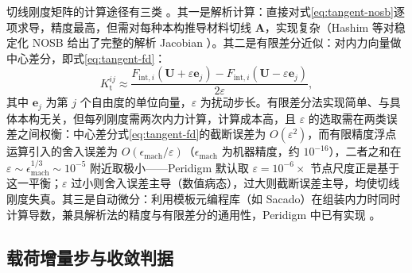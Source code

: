 切线刚度矩阵的计算途径有三类 \cite{Littlewood2015}。其一是解析计算：直接对式\eqref{eq:tangent-nosb}逐项求导，精度最高，但需对每种本构推导材料切线 $\mathbf{A}$，实现复杂（Hashim 等对稳定化 NOSB 给出了完整的解析 Jacobian \cite{Hashim2020}）。其二是有限差分近似：对内力向量做中心差分，即式\eqref{eq:tangent-fd}：
\begin{equation}
  K_{\mathrm{t}}^{ij}\approx\frac{F_{\mathrm{int},i}(\mathbf{U}+\varepsilon\mathbf{e}_{j})-F_{\mathrm{int},i}(\mathbf{U}-\varepsilon\mathbf{e}_{j})}{2\varepsilon},
  \label{eq:tangent-fd}
\end{equation}
其中 $\mathbf{e}_{j}$ 为第 $j$ 个自由度的单位向量，$\varepsilon$ 为扰动步长。有限差分法实现简单、与具体本构无关，但每列刚度需两次内力计算，计算成本高，且 $\varepsilon$ 的选取需在两类误差之间权衡：中心差分式\eqref{eq:tangent-fd}的截断误差为 $O(\varepsilon^{2})$，而有限精度浮点运算引入的舍入误差为 $O(\epsilon_{\mathrm{mach}}/\varepsilon)$（$\epsilon_{\mathrm{mach}}$ 为机器精度，约 $10^{-16}$），二者之和在 $\varepsilon\sim\epsilon_{\mathrm{mach}}^{1/3}\sim10^{-5}$ 附近取极小——Peridigm 默认取 $\varepsilon=10^{-6}\times$ 节点尺度正是基于这一平衡；$\varepsilon$ 过小则舍入误差主导（数值病态），过大则截断误差主导，均使切线刚度失真。其三是自动微分：利用模板元编程库（如 Sacado）在组装内力时同时计算导数，兼具解析法的精度与有限差分的通用性，Peridigm 中已有实现 \cite{Littlewood2015}。

\subsection{载荷增量步与收敛判据}\label{sec:nl-stepping}

